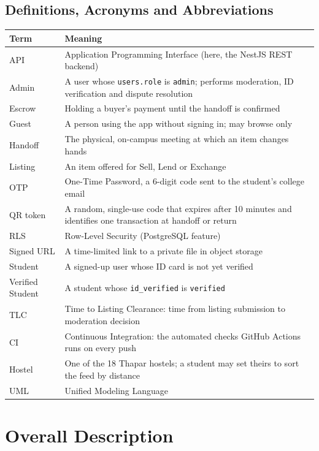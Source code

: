 \documentclass[11pt,a4paper]{scrreprt}
\begin{document}
\section{Definitions, Acronyms and Abbreviations}
\begin{longtable}{L{3.2cm} L{12cm}}
\toprule
\textbf{Term} & \textbf{Meaning}\\ \midrule\endhead
API & Application Programming Interface (here, the NestJS REST backend)\\
Admin & A user whose \texttt{users.role} is \texttt{admin}; performs moderation, ID verification and dispute resolution\\
Escrow & Holding a buyer's payment until the handoff is confirmed\\
Guest & A person using the app without signing in; may browse only\\
Handoff & The physical, on-campus meeting at which an item changes hands\\
Listing & An item offered for Sell, Lend or Exchange\\
OTP & One-Time Password, a 6-digit code sent to the student's college email\\
QR token & A random, single-use code that expires after 10 minutes and identifies one transaction at handoff or return\\
RLS & Row-Level Security (PostgreSQL feature)\\
Signed URL & A time-limited link to a private file in object storage\\
Student & A signed-up user whose ID card is not yet verified\\
Verified Student & A student whose \texttt{id_verified} is \texttt{verified}\\
TLC & Time to Listing Clearance: time from listing submission to moderation decision\\
CI & Continuous Integration: the automated checks GitHub Actions runs on every push\\
Hostel & One of the 18 Thapar hostels; a student may set theirs to sort the feed by distance\\
UML & Unified Modeling Language\\
\bottomrule
\end{longtable}


\chapter{Overall Description}
\end{document}
